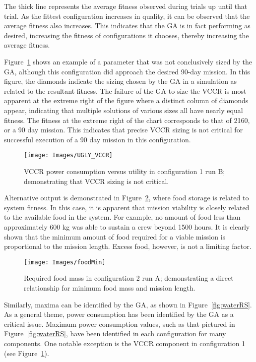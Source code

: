 \documentclass[submit]{aiaa}
\begin{document}
The thick line represents the average fitness observed during trials
up until that trial. As the fittest configuration increases in quality,
it can be observed that the average fitness also increases. This
indicates that the GA is in fact performing as desired, increasing the
fitness of configurations it chooses, thereby increasing the average
fitness.

Figure~\ref{fig:uglyVCCR} shows an example of a parameter that was not
conclusively sized by the GA, although this configuration did approach
the desired 90-day mission. In this figure, the diamonds indicate the
sizing chosen by the GA in a simulation as related to the resultant
fitness.
 The failure of the GA to size the VCCR is most apparent at the extreme right of the figure where a distinct column of diamonds appear, indicating that multiple solutions of various sizes all have nearly equal fitness. 
 The fitness at the extreme right of the chart
corresponds to that of 2160, or a 90 day mission. This indicates that
precise VCCR sizing is not critical for successful execution of a 90
day mission in this configuration.

\begin{figure}[htb]
\texttt{[image: Images/UGLY\_VCCR]}
\caption{VCCR power consumption versus utility in configuration 1 run B; demonstrating that VCCR sizing is not critical.}
\label{fig:uglyVCCR}
\end{figure}

Alternative output is demonstrated in Figure~\ref{fig:foodMin}, where
food storage is related to system fitness. 
In this case,  it is apparent that mission viability is closely related to the available food in the system. 
For example, no amount of food less than approximately 600 kg was able to sustain a crew beyond 1500 hours.  
It is clearly shown that the minimum amount of food required
for a viable mission is proportional to the mission length. Excess
food, however, is not a limiting factor. 

\begin{figure}[htb]
\texttt{[image: Images/foodMin]}
\caption{Required food mass in configuration 2 run A; demonstrating a direct relationship for minimum food mass and mission length.}
\label{fig:foodMin}
\end{figure}

Similarly, maxima can be identified by the GA, as shown in Figure~\ref{fig:waterRS}.  
As a general theme, power consumption has been identified by the GA as a critical issue. 
Maximum power consumption values, such as that pictured in
Figure~\ref{fig:waterRS}, have been identified in each configuration
for many components.  
One notable exception is the VCCR component in configuration 1 (see Figure~\ref{fig:uglyVCCR}).
\end{document}
